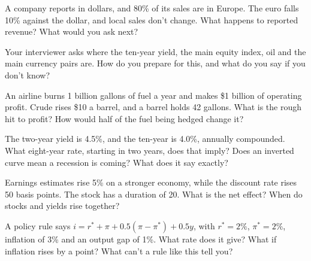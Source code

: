 \begin{question}\label{iq:iv2:macro-market-knowledge-and-pitches:5}
A company reports in dollars, and 80\% of its sales are in Europe. The euro falls 10\% against the dollar, and local sales don't change. What happens to reported revenue? What would you ask next?
\end{question}

\begin{question}\label{iq:iv2:macro-market-knowledge-and-pitches:6}
Your interviewer asks where the ten-year yield, the main equity index, oil and the main currency pairs are. How do you prepare for this, and what do you say if you don't know?
\end{question}

\begin{question}\label{iq:iv2:macro-market-knowledge-and-pitches:7}
An airline burns 1 billion gallons of fuel a year and makes \$1 billion of operating profit. Crude rises \$10 a barrel, and a barrel holds 42 gallons. What is the rough hit to profit? How would half of the fuel being hedged change it?
\end{question}

\begin{question}\label{iq:iv2:macro-market-knowledge-and-pitches:8}
The two-year yield is 4.5\%, and the ten-year is 4.0\%, annually compounded. What eight-year rate, starting in two years, does that imply? Does an inverted curve mean a recession is coming? What does it say exactly?
\end{question}

\begin{question}\label{iq:iv2:macro-market-knowledge-and-pitches:9}
Earnings estimates rise 5\% on a stronger economy, while the discount rate rises 50 basis points. The stock has a duration of 20. What is the net effect? When do stocks and yields rise together?
\end{question}

\begin{question}\label{iq:iv2:macro-market-knowledge-and-pitches:10}
A policy rule says $i = r^* + \pi + 0.5(\pi - \pi^*) + 0.5y$, with $r^* = 2\%$, $\pi^* = 2\%$, inflation of 3\% and an output gap of 1\%. What rate does it give? What if inflation rises by a point? What can't a rule like this tell you?
\end{question}

